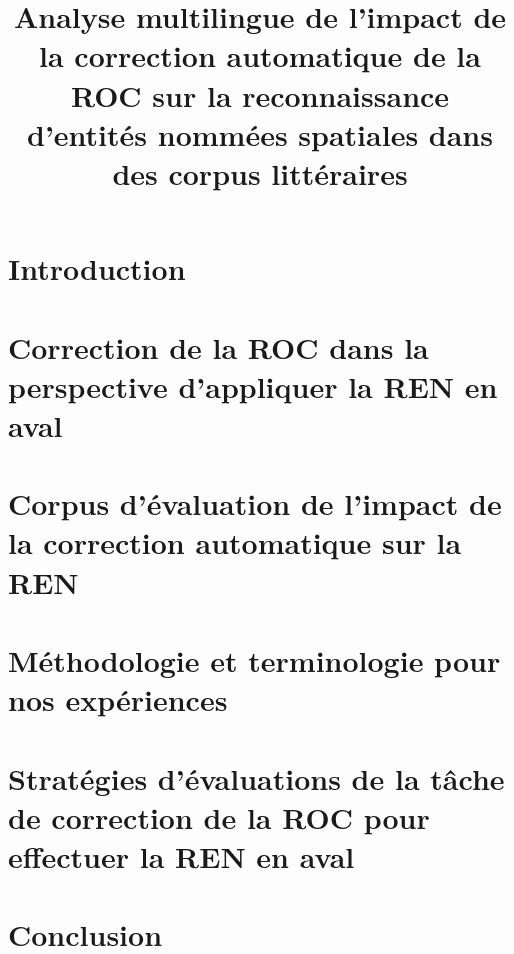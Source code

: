 \documentclass[utf8x]{article-hermes_frenchb}
\title[Contamination des OCR sur la REN]{Analyse multilingue de l'impact de la correction automatique de la ROC sur la reconnaissance d’entités nommées spatiales dans des corpus littéraires}
\begin{document}
\maketitlepage

\newcommand{\fakesentence}{Attention à ce que les figures et les tableaux ne débordent pas dans les marges. }
\newcommand{\fakeparagraph}{
\fakesentence
\fakesentence
\fakesentence
\fakesentence
\fakesentence
\fakesentence
}

\newcommand{\TAL}{traitement automatique des langues}

\newcommand{\CAD}{c'est-à-dire}
\newcommand{\COLL}{et collègues}
\newcommand{\PEX}{par exemple}
\newcommand{\POPP}{par opposition à}

\newcommand{\cad}{c.-à-d.}
\newcommand{\coll}{et~coll.}
\newcommand{\pex}{p.~ex.}
\newcommand{\popp}{p.~opp.}

\section{Introduction}




\section{Correction de la ROC dans la perspective d'appliquer la REN en aval}

\label{sec:sota}

\section{Corpus d'évaluation de l'impact de la correction automatique sur la REN}
\label{sec:data}



\section{Méthodologie et terminologie pour nos expériences}

\label{sec:Meth}
\section{Stratégies d'évaluations de la tâche de correction de la ROC pour effectuer la REN en aval}
\label{sec:expe}


\section{Conclusion}

\label{sec:concl}



\end{document}

